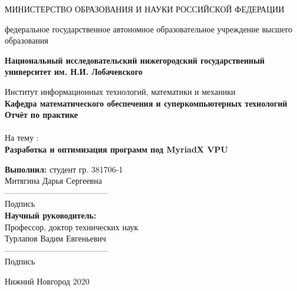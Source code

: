\documentclass{article}
\begin{document}
    \begin{center} 
    \large МИНИСТЕРСТВО ОБРАЗОВАНИЯ И НАУКИ РОССИЙСКОЙ ФЕДЕРАЦИИ

федеральное государственное автономное образовательное учреждение высшего образования

\textbf{Национальный исследовательский нижегородский государственный университет им. Н.И. Лобачевского}

Институт информационных технологий, математики и механики \\
\textbf{Кафедра математического обеспечения и суперкомпьютерных технологий}\\[3.5cm] 
    
    \huge \textbf{Отчёт по практике} \\[0.6cm] %
    \\ 
    \huge{На тему :}\\[0.6cm]
    \huge \textbf{Разработка и оптимизация программ под MyriadX VPU}\\[5.7cm]
    
    
    \end{center} 
    
    \begin{flushright}
    \large \textbf{Выполнил:} 
    студент гр. 381706-1 \\
    Митягина Дарья Сергеевна \\ [0.65cm]
    --------------------------------------\\
                                Подпись\\
    \textbf{Научный руководитель:} \\
    Профессор, доктор технических наук\\
    Турлапов Вадим Евгеньевич \\ [0.65cm]
    --------------------------------------\\
                                Подпись\\
    [3.2cm]
    \end{flushright}
    
    
    \begin{center} 
    \large Нижний Новгород 2020
    \end{center} 

    \newpage
      \begin{center}
      \end{center}
        \tableofcontents
      
\end{document}
